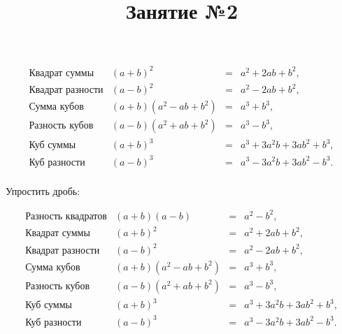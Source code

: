 \begin{listofex}
\[\begin{array}{cccc}
		\text{Квадрат суммы}&(a+b)^2& =&a^2+2ab+b^2,\\
		\text{Квадрат разности}&(a-b)^2& =&a^2-2ab+b^2,\\
		\text{Сумма кубов}&(a+b)(a^2-ab+b^2)& =&a^3+b^3,\\
		\text{Разность кубов}&(a-b)(a^2+ab+b^2)& =&a^3-b^3,\\
		\text{Куб суммы}&(a+b)^3& =&a^3+3a^2b+3ab^2+b^3,\\
		\text{Куб разности}&(a-b)^3& =&a^3-3a^2b+3ab^2-b^3.\\
	\end{array} \]
	\item Упростить дробь:
	\begin{enumcols}[itemcolumns=3]
		\item {}
		\item {}
		\item {}
		\item {}
		\item {}
		\item {}
	\end{enumcols}
\end{listofex}
\newpage
\title{Занятие №2}
\[ \begin{array}{cccc}
	\text{Разность квадратов}&(a+b)(a-b)& =&a^2-b^2,\\
	\text{Квадрат суммы}&(a+b)^2& =&a^2+2ab+b^2,\\
	\text{Квадрат разности}&(a-b)^2& =&a^2-2ab+b^2,\\
	\text{Сумма кубов}&(a+b)(a^2-ab+b^2)& =&a^3+b^3,\\
	\text{Разность кубов}&(a-b)(a^2+ab+b^2)& =&a^3-b^3,\\
	\text{Куб суммы}&(a+b)^3& =&a^3+3a^2b+3ab^2+b^3,\\
	\text{Куб разности}&(a-b)^3& =&a^3-3a^2b+3ab^2-b^3.\\
\end{array} \]
